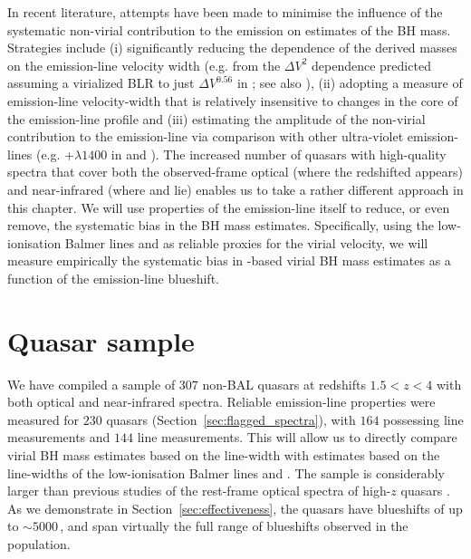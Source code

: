 In recent literature, attempts have been made to minimise the influence of the systematic non-virial contribution to the  emission on estimates of the BH mass.
Strategies include (i) significantly reducing the dependence of the derived masses on the emission-line velocity width (e.g. from the $\Delta V^2$ dependence predicted assuming a virialized BLR to just $\Delta V^{0.56}$ in \citealt{park13}; see also \citealt{shen12}), (ii) adopting a measure of emission-line velocity-width that is relatively insensitive to changes in the core of the emission-line profile \citep[e.g.][]{denney13} and (iii) estimating the amplitude of the non-virial contribution to the  emission-line via comparison with other ultra-violet emission-lines (e.g. +$\lambda$$1400$ in \citealt{runnoe13} and \citealt{brotherton15}).
The increased number of quasars with high-quality spectra that cover both the observed-frame optical (where the redshifted  appears) and near-infrared (where \hb and \ha lie) enables us to take a rather different approach in this chapter.
We will use properties of the  emission-line itself to reduce, or even remove, the systematic bias in the BH mass estimates.
Specifically, using the low-ionisation Balmer lines \ha and \hb as reliable proxies for the virial velocity, we will measure empirically the systematic bias in -based virial BH mass estimates as a function of the  emission-line blueshift.

\section{Quasar sample}

We have compiled a sample of $307$ non-BAL quasars at redshifts $1.5 < z < 4$ with both optical and near-infrared spectra.
Reliable emission-line properties were measured for $230$ quasars (Section~\ref{sec:flagged_spectra}), with $164$ possessing \ha line measurements and $144$ \hb line measurements.
This will allow us to directly compare virial BH mass estimates based on the  line-width with estimates based on the line-widths of the low-ionisation Balmer lines \ha and \hbns.
The sample is considerably larger than previous studies of the rest-frame optical spectra of high-$z$ quasars \citep[e.g.][]{shen12}.
As we demonstrate in Section~\ref{sec:effectiveness}, the quasars have  blueshifts of up to $\sim5000$\,\kms, and span virtually the full range of blueshifts observed in the population.

